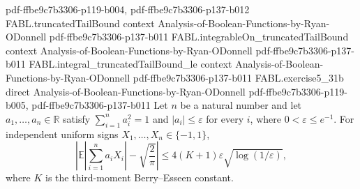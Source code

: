 \begin{theorem}
  {pdf-ffbe9c7b3306-p119-b004,
    pdf-ffbe9c7b3306-p137-b012}
\proofstep
  {FABL.truncatedTailBound}
  {context}
  {Analysis-of-Boolean-Functions-by-Ryan-ODonnell}
  {pdf-ffbe9c7b3306-p137-b011}
\proofstep
  {FABL.integrableOn_truncatedTailBound}
  {context}
  {Analysis-of-Boolean-Functions-by-Ryan-ODonnell}
  {pdf-ffbe9c7b3306-p137-b011}
\proofstep
  {FABL.integral_truncatedTailBound_le}
  {context}
  {Analysis-of-Boolean-Functions-by-Ryan-ODonnell}
  {pdf-ffbe9c7b3306-p137-b011}
\proofstep
  {FABL.exercise5_31b}
  {direct}
  {Analysis-of-Boolean-Functions-by-Ryan-ODonnell}
  {pdf-ffbe9c7b3306-p119-b005,
    pdf-ffbe9c7b3306-p137-b011}
Let $n$ be a natural number and let $a_1,\dots,a_n\in\mathbb R$ satisfy $\sum_{i=1}^n
a_i^2=1$ and $|a_i|\le\varepsilon$ for every $i$, where $0<\varepsilon\le e^{-1}$. For
independent uniform signs $X_1,\dots,X_n\in\{-1,1\}$,
\[
\left|\mathbb E\left|\sum_{i=1}^n a_iX_i\right|-\sqrt{\frac{2}{\pi}}\right|\le
4(K+1)\varepsilon\sqrt{\log(1/\varepsilon)},
\]
where $K$ is the third-moment Berry–Esseen constant.
\end{theorem}

